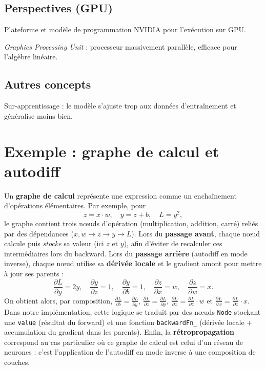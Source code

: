 \documentclass[a4paper,11pt]{article}
\begin{document}
\subsection*{Perspectives (GPU)}
\begin{description}[style=multiline, leftmargin=3cm, font=\bfseries]
\item[CUDA] Plateforme et modèle de programmation NVIDIA pour l'exécution sur GPU.
\item[GPU] \textit{Graphics Processing Unit} : processeur massivement parallèle, efficace pour l'algèbre linéaire.
\end{description}

\subsection*{Autres concepts}
\begin{description}[style=multiline, leftmargin=3cm, font=\bfseries]
\item[Overfitting] Sur-apprentissage : le modèle s'ajuste trop aux données d'entraînement et généralise moins bien.
\end{description}

\appendix
\section{Exemple : graphe de calcul et autodiff}\label{app:autodiff_example}
Un \textbf{graphe de calcul} représente une expression comme un enchaînement d'opérations élémentaires. Par exemple, pour
\[
z = x \cdot w,\quad y = z + b,\quad L = y^2,
\]
le graphe contient trois nœuds d'opération (multiplication, addition, carré) reliés par des dépendances ($x,w \rightarrow z \rightarrow y \rightarrow L$).
Lors du \textbf{passage avant}, chaque nœud calcule puis \emph{stocke} sa valeur (ici $z$ et $y$), afin d'éviter de recalculer ces intermédiaires lors du backward.
Lors du \textbf{passage arrière} (autodiff en mode inverse), chaque nœud utilise sa \textbf{dérivée locale} et le gradient amont pour mettre à jour ses parents :
\[
\frac{\partial L}{\partial y} = 2y,\quad
\frac{\partial y}{\partial z} = 1,\quad
\frac{\partial y}{\partial b} = 1,\quad
\frac{\partial z}{\partial x} = w,\quad
\frac{\partial z}{\partial w} = x.
\]
On obtient alors, par composition, $\frac{\partial L}{\partial b} = \frac{\partial L}{\partial y}$, $\frac{\partial L}{\partial z} = \frac{\partial L}{\partial y}$, $\frac{\partial L}{\partial x} = \frac{\partial L}{\partial z}\cdot w$ et $\frac{\partial L}{\partial w} = \frac{\partial L}{\partial z}\cdot x$.
Dans notre implémentation, cette logique se traduit par des nœuds \texttt{Node} stockant une \texttt{value} (résultat du forward) et une fonction \texttt{backwardFn\_} (dérivée locale + accumulation du gradient dans les parents).
Enfin, la \textbf{rétropropagation} correspond au cas particulier où ce graphe de calcul est celui d'un réseau de neurones : c'est l'application de l'autodiff en mode inverse à une composition de couches.
\end{document}
